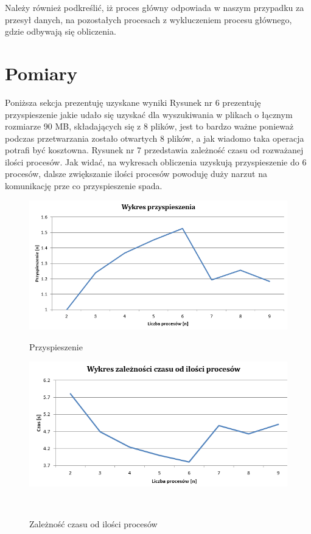 \documentclass[12pt,a4paper]{article}
\begin{document}
Należy również podkreślić, iż proces główny odpowiada w naszym przypadku za przesył danych, na pozostałych procesach z wykluczeniem procesu głównego, gdzie odbywają się obliczenia.

\section*{Pomiary}
Poniższa sekcja prezentuję uzyskane wyniki
Rysunek nr 6 prezentuję przyspieszenie jakie udało się uzyskać dla wyszukiwania w plikach o łącznym rozmiarze 90 MB, składających się z 8 plików, jest to bardzo ważne ponieważ podczas przetwarzania zostało otwartych 8 plików, a jak wiadomo taka operacja potrafi być kosztowna. Rysunek nr 7 przedstawia zależność czasu od rozważanej ilości procesów. Jak widać, na wykresach obliczenia uzyskują przyspieszenie do 6 procesów, dalsze zwiększanie ilości procesów powoduję duży narzut na komunikację prze co przyspieszenie spada.
\\
\begin{figure}[htbp]
\centering
\begin{minipage}[t]{0.7\linewidth}
\centering
\includegraphics[width=1.0\textwidth]{dane/przyspieszenie90.png}
\caption{Przyspieszenie}
\label{fig:stacked:first}
\end{minipage}%
\hspace{1cm}%
\begin{minipage}[t]{0.7\linewidth}
\centering
\includegraphics[width=1.0\textwidth]{dane/wykres_zaleznosci_od_ilosci_procesow90.png}
\caption{Zależność czasu od ilości procesów}
\label{fig:stacked:second}
\end{minipage}\\[20pt]
\hspace{1cm}%
\end{figure}
\end{document}
